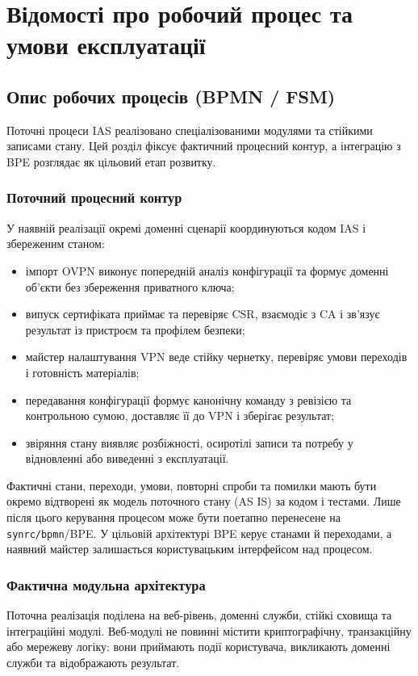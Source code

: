 \documentclass{article}
\begin{document}
\newpage
\section{Відомості про робочий процес та умови експлуатації}

\subsection{Опис робочих процесів (BPMN / FSM)}
Поточні процеси IAS реалізовано спеціалізованими модулями та стійкими записами стану. Цей розділ фіксує фактичний процесний контур, а інтеграцію з BPE розглядає як цільовий етап розвитку.

\subsubsection{Поточний процесний контур}
У наявній реалізації окремі доменні сценарії координуються кодом IAS і збереженим станом:
\begin{itemize}
    \item імпорт OVPN виконує попередній аналіз конфігурації та формує доменні об'єкти без збереження приватного ключа;
    \item випуск сертифіката приймає та перевіряє CSR, взаємодіє з CA і зв'язує результат із пристроєм та профілем безпеки;
    \item майстер налаштування VPN веде стійку чернетку, перевіряє умови переходів і готовність матеріалів;
    \item передавання конфігурації формує канонічну команду з ревізією та контрольною сумою, доставляє її до VPN і зберігає результат;
    \item звіряння стану виявляє розбіжності, осиротілі записи та потребу у відновленні або виведенні з експлуатації.
\end{itemize}

Фактичні стани, переходи, умови, повторні спроби та помилки мають бути окремо відтворені як модель поточного стану (AS IS) за кодом і тестами. Лише після цього керування процесом може бути поетапно перенесене на \texttt{synrc/bpmn}/BPE. У цільовій архітектурі BPE керує станами й переходами, а наявний майстер залишається користувацьким інтерфейсом над процесом.


\subsubsection{Фактична модульна архітектура}
Поточна реалізація поділена на веб-рівень, доменні служби, стійкі сховища та інтеграційні модулі. Веб-модулі не повинні містити криптографічну, транзакційну або мережеву логіку: вони приймають події користувача, викликають доменні служби та відображають результат.
\end{document}
